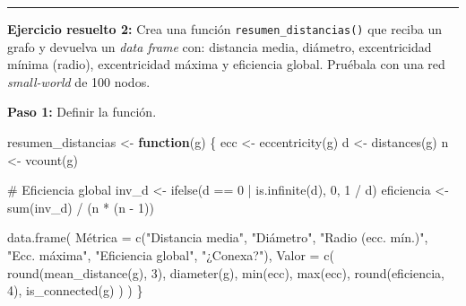 \documentclass[
  letterpaper,
  DIV=11,
  numbers=noendperiod]{scrreprt}
\newenvironment{Shaded}{\begin{snugshade}}{\end{snugshade}}
\newcommand{\AttributeTok}[1]{\textcolor[rgb]{0.40,0.45,0.13}{#1}}
\newcommand{\CommentTok}[1]{\textcolor[rgb]{0.37,0.37,0.37}{#1}}
\newcommand{\ControlFlowTok}[1]{\textcolor[rgb]{0.00,0.23,0.31}{\textbf{#1}}}
\newcommand{\DecValTok}[1]{\textcolor[rgb]{0.68,0.00,0.00}{#1}}
\newcommand{\FunctionTok}[1]{\textcolor[rgb]{0.28,0.35,0.67}{#1}}
\newcommand{\NormalTok}[1]{\textcolor[rgb]{0.00,0.23,0.31}{#1}}
\newcommand{\OtherTok}[1]{\textcolor[rgb]{0.00,0.23,0.31}{#1}}
\newcommand{\SpecialCharTok}[1]{\textcolor[rgb]{0.37,0.37,0.37}{#1}}
\newcommand{\StringTok}[1]{\textcolor[rgb]{0.13,0.47,0.30}{#1}}
\begin{document}
\begin{center}\rule{0.5\linewidth}{0.5pt}\end{center}

\textbf{Ejercicio resuelto 2:} Crea una función
\texttt{resumen\_distancias()} que reciba un grafo y devuelva un
\emph{data frame} con: distancia media, diámetro, excentricidad mínima
(radio), excentricidad máxima y eficiencia global. Pruébala con una red
\emph{small-world} de 100 nodos.

\begin{tcolorbox}[enhanced jigsaw, toprule=.15mm, colframe=quarto-callout-tip-color-frame, coltitle=black, titlerule=0mm, colback=white, breakable, leftrule=.75mm, arc=.35mm, bottomtitle=1mm, toptitle=1mm, rightrule=.15mm, bottomrule=.15mm, left=2mm, title=\textcolor{quarto-callout-tip-color}{\faLightbulb}\hspace{0.5em}{📝 Solución}, colbacktitle=quarto-callout-tip-color!10!white, opacityback=0, opacitybacktitle=0.6]

\textbf{Paso 1:} Definir la función.

\begin{Shaded}
\begin{Highlighting}[]
\NormalTok{resumen\_distancias }\OtherTok{\textless{}{-}} \ControlFlowTok{function}\NormalTok{(g) \{}
\NormalTok{  ecc }\OtherTok{\textless{}{-}} \FunctionTok{eccentricity}\NormalTok{(g)}
\NormalTok{  d }\OtherTok{\textless{}{-}} \FunctionTok{distances}\NormalTok{(g)}
\NormalTok{  n }\OtherTok{\textless{}{-}} \FunctionTok{vcount}\NormalTok{(g)}
  
  \CommentTok{\# Eficiencia global}
\NormalTok{  inv\_d }\OtherTok{\textless{}{-}} \FunctionTok{ifelse}\NormalTok{(d }\SpecialCharTok{==} \DecValTok{0} \SpecialCharTok{|} \FunctionTok{is.infinite}\NormalTok{(d), }\DecValTok{0}\NormalTok{, }\DecValTok{1} \SpecialCharTok{/}\NormalTok{ d)}
\NormalTok{  eficiencia }\OtherTok{\textless{}{-}} \FunctionTok{sum}\NormalTok{(inv\_d) }\SpecialCharTok{/}\NormalTok{ (n }\SpecialCharTok{*}\NormalTok{ (n }\SpecialCharTok{{-}} \DecValTok{1}\NormalTok{))}
  
  \FunctionTok{data.frame}\NormalTok{(}
\NormalTok{    Métrica }\OtherTok{=} \FunctionTok{c}\NormalTok{(}\StringTok{"Distancia media"}\NormalTok{, }\StringTok{"Diámetro"}\NormalTok{, }\StringTok{"Radio (ecc. mín.)"}\NormalTok{,}
                \StringTok{"Ecc. máxima"}\NormalTok{, }\StringTok{"Eficiencia global"}\NormalTok{, }\StringTok{"¿Conexa?"}\NormalTok{),}
    \AttributeTok{Valor =} \FunctionTok{c}\NormalTok{(}
      \FunctionTok{round}\NormalTok{(}\FunctionTok{mean\_distance}\NormalTok{(g), }\DecValTok{3}\NormalTok{),}
      \FunctionTok{diameter}\NormalTok{(g),}
      \FunctionTok{min}\NormalTok{(ecc),}
      \FunctionTok{max}\NormalTok{(ecc),}
      \FunctionTok{round}\NormalTok{(eficiencia, }\DecValTok{4}\NormalTok{),}
      \FunctionTok{is\_connected}\NormalTok{(g)}
\NormalTok{    )}
\NormalTok{  )}
\NormalTok{\}}
\end{Highlighting}
\end{Shaded}


\end{tcolorbox}
\end{document}
